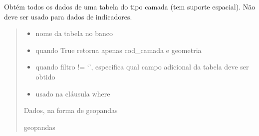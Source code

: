 \documentclass[letterpaper,10pt,brazil]{sphinxmanual}
\begin{document}
\begin{fulllineitems}
\begin{fulllineitems}
\label{\detokenize{api_gen/apiModulo.api_consulta:apiModulo.api_consulta.ApiConsulta.obterCamada}}
\pysigstartsignatures
{}
\pysigstopsignatures
\sphinxAtStartPar
Obtém todos os dados de uma tabela do tipo camada (tem suporte espacial). 
Não deve ser usado para dados de indicadores.
\begin{quote}\begin{description}
\begin{itemize}
\item {} 
\sphinxAtStartPar
{} \textendash{} nome da tabela no banco

\item {} 
\sphinxAtStartPar
{} \textendash{} quando True retorna apenas cod\_camada e geometria

\item {} 
\sphinxAtStartPar
{} \textendash{} quando filtro != ‘’, especifica qual campo adicional da tabela deve ser obtido

\item {} 
\sphinxAtStartPar
{} \textendash{} usado na cláusula where

\end{itemize}

\sphinxAtStartPar
Dados, na forma de geopandas

\sphinxAtStartPar
geopandas

\end{description}\end{quote}

\end{fulllineitems}



\end{fulllineitems}
\end{document}
